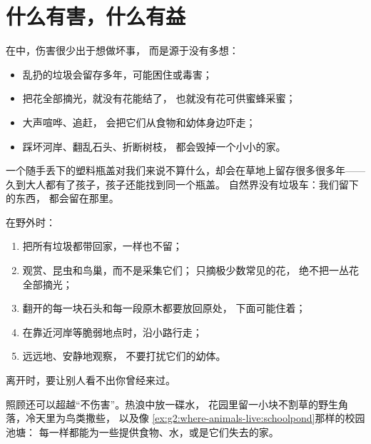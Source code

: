 \section{什么有害，什么有益}

\begin{proposition}\label{prop:g2:caring-for-nature:harm}
在中，伤害很少出于想做坏事，
而是源于没有多想：
\begin{itemize}
  \item 乱扔的垃圾会留存多年，可能困住或毒害；
  \item 把花全部摘光，就没有花能结了，
        也就没有花可供蜜蜂采蜜；
  \item 大声喧哗、追赶，
        会把它们从食物和幼体身边吓走；
  \item 踩坏河岸、翻乱石头、折断树枝，
        都会毁掉一个小小的家。
\end{itemize}
\end{proposition}
\admitted

\begin{example}[瓶盖]\label{ex:g2:caring-for-nature:cap}
一个随手丢下的塑料瓶盖对我们来说不算什么，却会在草地上留存很多很多年——
久到大人都有了孩子，孩子还能找到同一个瓶盖。
自然界没有垃圾车：我们留下的东西，
都会留在那里。
\end{example}

\begin{method}[游客守则]\label{met:g2:caring-for-nature:rules}
在野外时：
\begin{enumerate}
  \item 把所有垃圾都带回家，一样也不留；
  \item 观赏、昆虫和鸟巢，而不是采集它们；
        只摘极少数常见的花，
        绝不把一丛花全部摘光；
  \item 翻开的每一块石头和每一段原木都要放回原处，
        下面可能住着；
  \item 在靠近河岸等脆弱地点时，沿小路行走；
  \item 远远地、安静地观察，
        不要打扰它们的幼体。
\end{enumerate}
离开时，要让别人看不出你曾经来过。
\end{method}

\begin{example}[主动去帮忙]\label{ex:g2:caring-for-nature:help}
照顾还可以超越“不伤害”。热浪中放一碟水，
花园里留一小块不割草的野生角落，冷天里为鸟类撒些，
以及像
\cref{ex:g2:where-animals-live:schoolpond}那样的校园池塘：
每一样都能为一些提供食物、水，或是它们失去的家。
\end{example}

